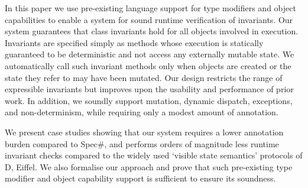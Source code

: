 In this paper we use pre-existing language support for type modifiers and object capabilities to enable a system for sound runtime verification of invariants.
Our system guarantees that class invariants hold for all objects involved in execution.
Invariants are specified simply as methods whose execution is statically guaranteed to be deterministic and not access any externally mutable state.
We automatically call such invariant methods only when objects are created or the state they refer to may have been mutated.
Our design restricts the range of expressible invariants but improves upon the usability and performance of prior work.
In addition, we soundly support mutation, dynamic dispatch, exceptions, and non-determinism, while requiring only a modest amount of annotation.

We present case studies showing that our system requires a lower annotation burden compared to Spec\#, and  performs orders of magnitude less runtime invariant checks compared to the widely used `visible state semantics' protocols of D, Eiffel.
We also formalise our approach and prove that such pre-existing type modifier and object capability support is sufficient to ensure its soundness. %